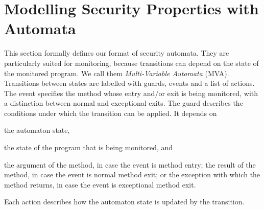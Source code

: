 \section{Modelling Security Properties with Automata}\label{SecMVA}

This section formally defines our format of security automata. They
are particularly suited for monitoring, because transitions can depend
on the state of the monitored program. We call them
\emph{Multi-Variable Automata} (MVA). %
Transitions between states are labelled with guards, events and a list
of actions. The event specifies the method whose entry and/or exit is
being monitored, with a distinction between normal and exceptional
exits.  The guard describes the conditions under which the transition
can be applied. It depends on
\begin{inparaenum}
\item the automaton state,
\item the state of the program that is being monitored, and
\item the argument of the method, in case the event is method entry;
the result of the method, in case the event is normal method exit; or
the exception with which the method returns, in case the event is
exceptional method exit.
\end{inparaenum}
Each action describes how the automaton state is updated by the transition.

